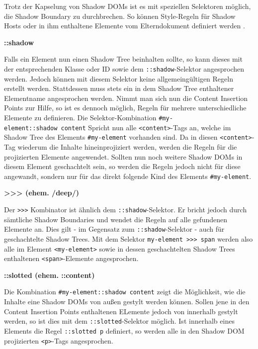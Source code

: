 Trotz der Kapselung von Shadow DOMs ist es mit speziellen Selektoren möglich, die Shadow Boundary zu durchbrechen. So können Style-Regeln für Shadow Hosts oder in ihm enthaltene Elemente vom Elterndokument definiert werden \cite{citeulike:13883067}.

\textbf{::shadow}

Falls ein Element nun einen Shadow Tree beinhalten sollte, so kann dieses mit der entsprechenden Klasse oder ID sowie dem \texttt{::shadow}-Selektor angesprochen werden. Jedoch können mit diesem Selektor keine allgemeingültigen Regeln erstellt werden. Stattdessen muss stets ein in dem Shadow Tree enthaltener Elementname angesprochen
werden. Nimmt man sich nun die Content Insertion Points zur Hilfe, so ist es dennoch möglich, Regeln für mehrere unterschiedliche Elemente zu definieren. Die Selektor-Kombination \texttt{\#my-element::shadow\ content} Spricht nun alle \texttt{\textless{}content\textgreater{}}-Tags an, welche im Shadow Tree des Elements \texttt{\#my-element} vorhanden sind. Da in diesen \texttt{\textless{}content\textgreater{}}-Tag wiederum die Inhalte hineinprojiziert werden, werden die Regeln für die projizierten Elemente angewendet. Sollten nun noch weitere Shadow DOMs in diesem Element geschachtelt sein, so werden die Regeln jedoch nicht für diese angewandt, sondern nur für das direkt folgende Kind des Elements \texttt{\#my-element}.

\textbf{\textgreater{}\textgreater{}\textgreater{} (ehem. /deep/)}

Der \texttt{\textgreater{}\textgreater{}\textgreater{}} Kombinator ist ähnlich dem \texttt{::shadow}-Selektor. Er bricht jedoch durch sämtliche Shadow Boundaries und wendet die Regeln auf alle gefundenen Elemente an. Dies gilt - im Gegensatz zum \texttt{::shadow}-Selektor - auch für geschachtelte Shadow Trees. Mit dem Selektor \texttt{my-element\ \textgreater{}\textgreater{}\textgreater{}\ span} werden also alle im Element \texttt{\textless{}my-element\textgreater{}} sowie in dessen geschachtelten Shadow Trees enthaltenen \texttt{\textless{}span\textgreater{}}-Elemente angesprochen.

\textbf{::slotted (ehem. ::content)}

Die Kombination \texttt{\#my-element::shadow\ content} zeigt die Möglichkeit, wie die Inhalte eine Shadow DOMs von außen gestylt werden können. Sollen jene in den Content Insertion Points enthaltenen ELemente jedoch von innerhalb gestylt werden, so ist dies mit dem \texttt{::slotted}-Selektor möglich. Ist innerhalb eines Elements die Regel \texttt{::slotted\ p} definiert, so werden alle in den Shadow DOM projizierten \texttt{\textless{}p\textgreater{}}-Tags angesprochen.

